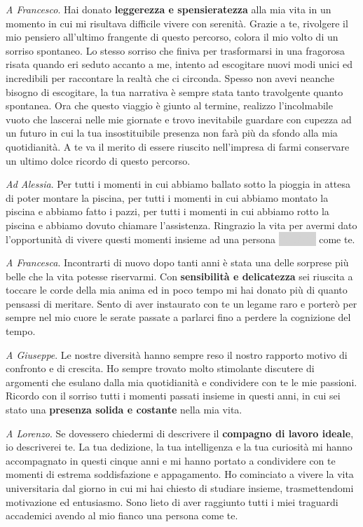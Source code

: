 \emph{A Francesco}. Hai donato \textbf{leggerezza e spensieratezza} alla mia vita in un momento in cui mi risultava difficile vivere con serenità. Grazie a te, rivolgere il mio pensiero all'ultimo frangente di questo percorso, colora il mio volto di un sorriso spontaneo. Lo stesso sorriso che finiva per trasformarsi in una fragorosa risata quando eri seduto accanto a me, intento ad escogitare nuovi modi unici ed incredibili per raccontare la realtà che ci circonda. Spesso non avevi neanche bisogno di escogitare, la tua narrativa è sempre stata tanto travolgente quanto spontanea. Ora che questo viaggio è giunto al termine, realizzo l'incolmabile vuoto che lascerai nelle mie giornate e trovo inevitabile guardare con cupezza ad un futuro in cui la tua insostituibile presenza non farà più da sfondo alla mia quotidianità. A te va il merito di essere riuscito nell'impresa di farmi conservare un ultimo dolce ricordo di questo percorso. 


\emph{Ad Alessia}. Per tutti i momenti in cui abbiamo ballato sotto la pioggia in attesa di poter montare la piscina, per tutti i momenti in cui abbiamo montato la piscina e abbiamo fatto i pazzi, per tutti i momenti in cui abbiamo rotto la piscina e abbiamo dovuto chiamare l'assistenza. Ringrazio la vita per avermi dato l'opportunità di vivere questi momenti insieme ad una persona \textcolor{lightgray}{\colorbox{lightgray}{????????}} come te.

\emph{A Francesca}. Incontrarti di nuovo dopo tanti anni è stata una delle sorprese più belle che la vita potesse riservarmi. Con \textbf{sensibilità e delicatezza} sei riuscita a toccare le corde della mia anima ed in poco tempo mi hai donato più di quanto pensassi di meritare. Sento di aver instaurato con te un legame raro e porterò per sempre nel mio cuore le serate passate a parlarci fino a perdere la cognizione del tempo. 

\emph{A Giuseppe}. Le nostre diversità hanno sempre reso il nostro rapporto motivo di confronto e di crescita. Ho sempre trovato molto stimolante discutere di argomenti che esulano dalla mia quotidianità e condividere con te le mie passioni. Ricordo con il sorriso tutti i momenti passati insieme in questi anni, in cui sei stato una \textbf{presenza solida e costante} nella mia vita. 

\emph{A Lorenzo}. Se dovessero chiedermi di descrivere il \textbf{compagno di lavoro ideale}, io descriverei te. La tua dedizione, la tua intelligenza e la tua curiosità mi hanno accompagnato in questi cinque anni e mi hanno portato a condividere con te momenti di estrema soddisfazione e appagamento. Ho cominciato a vivere la vita universitaria dal giorno in cui mi hai chiesto di studiare insieme, trasmettendomi motivazione ed entusiasmo. Sono lieto di aver raggiunto tutti i miei traguardi accademici avendo al mio fianco una persona come te. 

